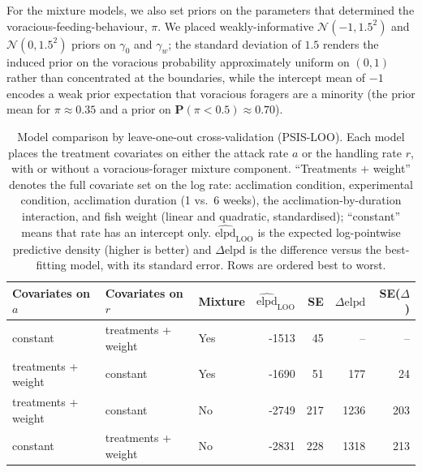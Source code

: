 \documentclass[ASNA,twocolumn]{USG} %
\begin{document}
For the mixture models, we also set priors on the parameters that determined the voracious-feeding-behaviour, $\pi$. We placed weakly-informative $\mathcal{N}(-1,1.5^2)$ and $\mathcal{N}(0,1.5^2)$ priors on $\gamma_0$ and $\gamma_w$; the standard deviation of $1.5$ renders the induced prior on the voracious probability approximately uniform on $(0,1)$ rather than concentrated at the boundaries, while the intercept mean of $-1$ encodes a weak prior expectation that voracious foragers are a minority (the prior mean for $\pi\approx 0.35$ and a prior on $\mathbf{P}(\pi < 0.5)\approx 0.70$).


\begin{table}[!t]%
\centering %
\caption{Model comparison by leave-one-out cross-validation (PSIS-LOO). Each model places the treatment covariates on either the attack rate \begin{math}a\end{math} or the handling rate \begin{math}r\end{math}, with or without a voracious-forager mixture component. ``Treatments + weight'' denotes the full covariate set on the log rate: acclimation condition, experimental condition, acclimation duration (1 vs.\ 6 weeks), the acclimation-by-duration interaction, and fish weight (linear and quadratic, standardised); ``constant'' means that rate has an intercept only. \begin{math}\widehat{\mathrm{elpd}}_{\mathrm{LOO}}\end{math} is the expected log-pointwise predictive density (higher is better) and \begin{math}\Delta\mathrm{elpd}\end{math} is the difference versus the best-fitting model, with its standard error. Rows are ordered best to worst.\label{tab:model_comparison}}%
\begin{tabular*}{\textwidth}{@{\extracolsep\fill}lllrrrr@{\extracolsep\fill}}
\toprule
\textbf{Covariates on }\begin{math}a\end{math} & \textbf{Covariates on }\begin{math}r\end{math} & \textbf{Mixture} & \begin{math}\widehat{\mathrm{elpd}}_{\mathrm{LOO}}\end{math} & \textbf{SE} & \begin{math}\Delta\mathrm{elpd}\end{math} & \textbf{SE(\begin{math}\Delta\end{math})} \\
\midrule
constant & treatments + weight & Yes & -1513 & 45 & -- & -- \\
treatments + weight & constant & Yes & -1690 & 51 & 177 & 24 \\
treatments + weight & constant & No & -2749 & 217 & 1236 & 203 \\
constant & treatments + weight & No & -2831 & 228 & 1318 & 213 \\
\bottomrule
\end{tabular*}

\end{table}
\end{document}
